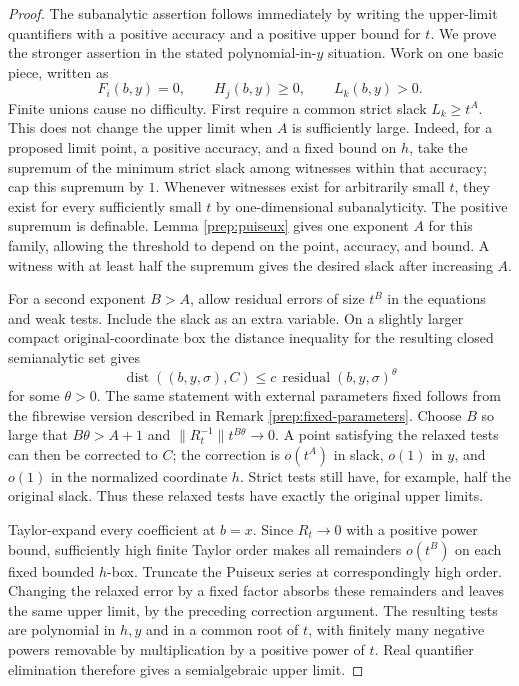 \begin{proof}
The subanalytic assertion follows immediately by writing the
upper-limit quantifiers with a positive accuracy and a positive
upper bound for $t$. We prove the stronger assertion in the stated
polynomial-in-$y$ situation. Work on one basic piece, written as
\[
 F_i(b,y)=0,\qquad H_j(b,y)\geq0,\qquad L_k(b,y)>0.
\]
Finite unions cause no difficulty. First require a common strict
slack $L_k\geq t^A$. This does not change the upper limit when $A$
is sufficiently large. Indeed, for a proposed limit point, a positive
accuracy, and a fixed bound on $h$, take the supremum of the minimum
strict slack among witnesses within that accuracy; cap this supremum
by $1$. Whenever witnesses exist for arbitrarily small $t$, they
exist for every sufficiently small $t$ by one-dimensional
subanalyticity. The positive supremum is definable. Lemma
\ref{prep:puiseux} gives one exponent $A$ for this family, allowing
the threshold to depend on the point, accuracy, and bound. A witness
with at least half the supremum gives the desired slack after
increasing $A$.

For a second exponent $B>A$, allow residual errors of size $t^B$
in the equations and weak tests. Include the slack as an extra
variable. On a slightly larger compact original-coordinate box the
distance inequality for the resulting closed semianalytic set gives
\[
 \operatorname{dist}((b,y,\sigma),C)
      \leq c\,\operatorname{residual}(b,y,\sigma)^{\theta}
\]
for some $\theta>0$. The same statement with external parameters
fixed follows from the fibrewise version described in Remark
\ref{prep:fixed-parameters}. Choose $B$ so large that
$B\theta>A+1$ and
$\|R_t^{-1}\|t^{B\theta}\to0$.
A point satisfying the relaxed tests can then be corrected to $C$;
the correction is $o(t^A)$ in slack, $o(1)$ in $y$, and $o(1)$ in
the normalized coordinate $h$. Strict tests still have, for example,
half the original slack. Thus these relaxed tests have exactly the
original upper limits.

Taylor-expand every coefficient at $b=x$. Since $R_t\to0$ with a
positive power bound, sufficiently high finite Taylor order makes
all remainders $o(t^B)$ on each fixed bounded $h$-box. Truncate the
Puiseux series at correspondingly high order. Changing the relaxed
error by a fixed factor absorbs these remainders and leaves the same
upper limit, by the preceding correction argument. The resulting
tests are polynomial in $h,y$ and in a common root of $t$, with
finitely many negative powers removable by multiplication by a
positive power of $t$. Real quantifier elimination therefore gives
a semialgebraic upper limit.


\end{proof}
